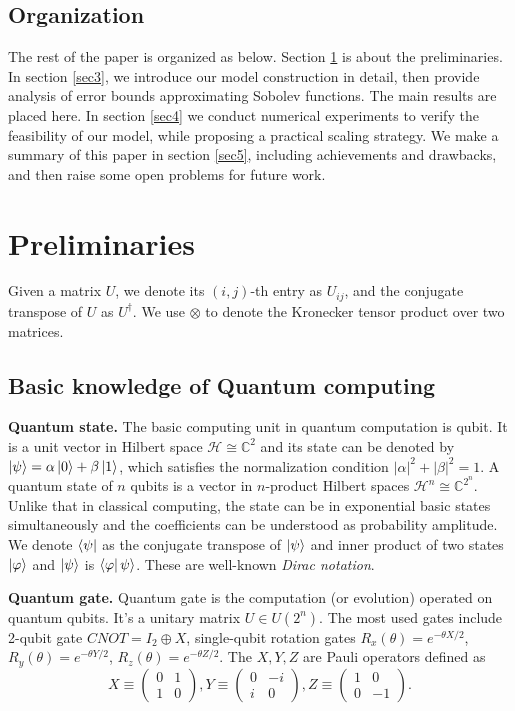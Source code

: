 \documentclass{article}
\theoremstyle{plain}
\theoremstyle{definition}
\theoremstyle{remark}
\begin{document}
\subsection{Organization}
The rest of the paper is organized as below. Section \ref{sec2}
is about the preliminaries. In section \ref{sec3}, we introduce our model construction in detail, then provide analysis of error bounds approximating Sobolev functions. The main results are placed here. In section \ref{sec4} we conduct numerical experiments to verify the feasibility of our model, while proposing a practical scaling strategy. We make a summary of this paper in section \ref{sec5}, including achievements and drawbacks, and then raise some open problems for future work.


\section{Preliminaries}\label{sec2}
Given a matrix $U$, we denote its $(i,j)$-th entry as $U_{ij}$, and the conjugate transpose of $U$ as $U^\dagger$. We use $\otimes$ to denote the Kronecker tensor product over two matrices.

\subsection{Basic knowledge of Quantum computing}
\textbf{Quantum state.} The basic computing unit in quantum computation is qubit. It is a unit vector in Hilbert space $\mathcal{H}\cong \mathbb{C}^2$ and its state can be denoted by $\ket{\psi}=\alpha\ket{0}+\beta\ket{1}$, which satisfies the normalization condition $|\alpha|^2+|\beta|^2 = 1$. A quantum state of $n$ qubits is a vector in $n$-product Hilbert spaces $\mathcal{H}^{n}\cong \mathbb{C}^{2^n}$. Unlike that in classical computing, the state can be in exponential basic states simultaneously and the coefficients can be understood as probability amplitude. We denote $\bra{\psi}$ as the conjugate transpose of $\ket{\psi}$ and inner product of two states $\ket{\varphi}$ and $\ket{\psi}$ is $\bra{\varphi}\psi\rangle$. These are well-known \textit{Dirac notation}.

\textbf{Quantum gate.} Quantum gate is the computation (or evolution) operated on quantum qubits. It's a unitary matrix $U\in U(2^n)$. The most used gates include 2-qubit gate $CNOT=I_2\oplus X$, single-qubit rotation gates $R_x(\theta) = e^{-\theta X/2}$, $R_y(\theta) = e^{-\theta Y/2}$, $R_z(\theta) = e^{-\theta Z/2}$. The $X,Y,Z$ are Pauli operators defined as
\begin{equation*}
    X 
    \equiv
    \begin{pmatrix}
        0 & 1 \\
        1 & 0
    \end{pmatrix},
    Y
    \equiv
    \begin{pmatrix}
        0 & -i \\
        i & 0
    \end{pmatrix},
    Z
    \equiv
    \begin{pmatrix}
        1 & 0 \\
        0 & -1
    \end{pmatrix}.
\end{equation*}
 
\end{document}

